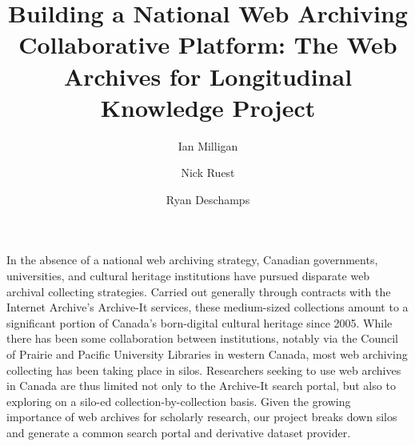 \documentclass[sigconf]{acmart}
\begin{document}
\title{Building a National Web Archiving Collaborative Platform: The Web Archives for Longitudinal Knowledge Project}

\author{Ian Milligan}

\author{Nick Ruest}

\author{Ryan Deschamps}


\maketitle

In the absence of a national web archiving strategy, Canadian governments, universities, and cultural heritage institutions have pursued disparate web archival collecting strategies. Carried out generally through contracts with the Internet Archive's Archive-It services, these medium-sized collections amount to a significant portion of Canada's born-digital cultural heritage since 2005. While there has been some collaboration between institutions, notably via the Council of Prairie and Pacific University Libraries in western Canada, most web archiving collecting has been taking place in silos. Researchers seeking to use web archives in Canada are thus limited not only to the Archive-It search portal, but also to exploring on a silo-ed collection-by-collection basis. Given the growing importance of web archives for scholarly research, our project breaks down silos and generate a common search portal and derivative dataset provider.\\
\end{document}
